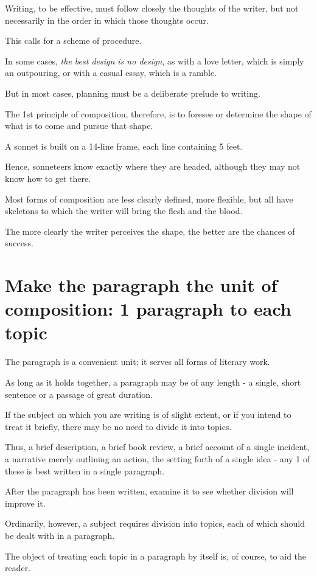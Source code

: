 \documentclass{book}
\numberwithin{equation}{section}
\begin{document}
Writing, to be effective, must follow closely the thoughts of the writer, but not necessarily in the order in which those thoughts occur.

This calls for a scheme of procedure.

In some cases, \textit{the best design is no design}, as with a love letter, which is simply an outpouring, or with a casual essay, which is a ramble.

But in most cases, planning must be a deliberate prelude to writing.

The 1st principle of composition, therefore, is to foresee or determine the shape of what is to come and pursue that shape.

%
A sonnet is built on a 14-line frame, each line containing 5 feet.

Hence, sonneteers know exactly where they are headed, although they may not know how to get there.

Most forms of composition are less clearly defined, more flexible, but all have skeletons to which the writer will bring the flesh and the blood.

The more clearly the writer perceives the shape, the better are the chances of success.

\section{Make the paragraph the unit of composition: 1 paragraph to each topic}
The paragraph is a convenient unit; it serves all forms of literary work.

As long as it holds together, a paragraph may be of any length - a single, short sentence or a passage of great duration.

%
If the subject on which you are writing is of slight extent, or if you intend to treat it briefly, there may be no need to divide it into topics.

Thus, a brief description, a brief book review, a brief account of a single incident, a narrative merely outlining an action, the setting forth of a single idea - any 1 of these is best written in a single paragraph.

After the paragraph has been written, examine it to see whether division will improve it.

%
Ordinarily, however, a subject requires division into topics, each of which should be dealt with in a paragraph.

The object of treating each topic in a paragraph by itself is, of course, to aid the reader.
\end{document}
